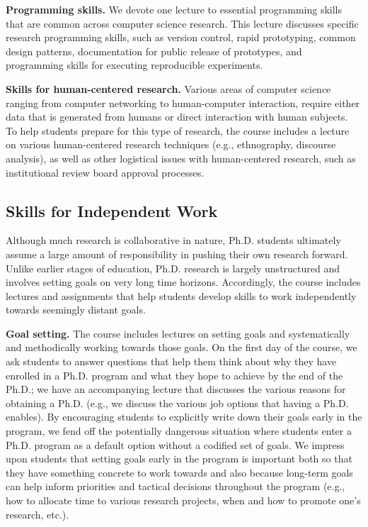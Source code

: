 \vspace*{0.1in}
\noindent
{\bf Programming skills.}  We devote one lecture to essential
programming skills that are common across computer science research.
This lecture discusses specific research programming skills, such as
version control, rapid prototyping, common design patterns,
documentation for public release of prototypes, and programming skills
for executing reproducible experiments.

\vspace*{0.1in}
\noindent
{\bf Skills for human-centered research.}  Various areas of computer
science ranging from computer networking to human-computer interaction,
require either data that is generated from humans or direct interaction
with human subjects.  To help students prepare for this type of
research, the course includes a lecture on various human-centered
research techniques (e.g., ethnography, discourse analysis), as well as
other logistical issues with human-centered research, such as
institutional review board approval processes.  



\subsection{Skills for Independent Work}

Although much research is collaborative in nature, Ph.D. students
ultimately assume a large amount of responsibility in pushing their own
research forward.  Unlike earlier stages of education, Ph.D. research is
largely unstructured and involves setting goals on very long time
horizons.  Accordingly, the course includes lectures and assignments
that help students develop skills to work independently towards
seemingly distant goals.  

\vspace*{0.1in}
\noindent
{\bf Goal setting.}  The course includes lectures on setting goals and
systematically and methodically working towards those goals.  On the
first day of the course, we ask students to answer questions that help
them think about why they have enrolled in a Ph.D. program and what they
hope to achieve by the end of the Ph.D.; we have an accompanying lecture
that discusses the various reasons for obtaining a Ph.D. (e.g., we
discuss the various job options that having a Ph.D. enables).  By
encouraging students to explicitly write down their goals early in the
program, we fend off the potentially dangerous situation where students
enter a Ph.D. program as a default option without a codified set of
goals.  We impress upon students that setting goals early in the program
is important both so that they have something concrete to work towards
and also because long-term goals can help inform priorities and tactical
decisions throughout the program (e.g., how to allocate time to various
research projects, when and how to promote one's research, etc.).

